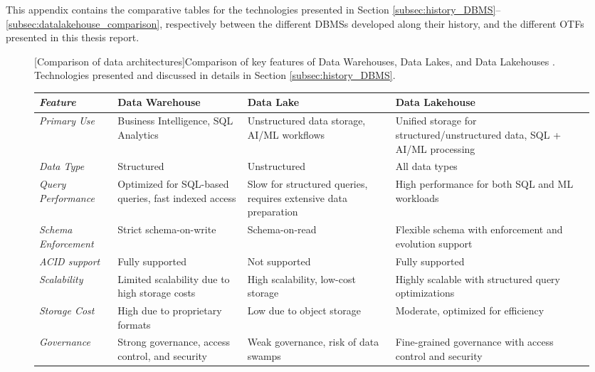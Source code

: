 This appendix contains the comparative tables for the technologies presented in Section \ref{subsec:history_DBMS}--\ref{subsec:datalakehouse_comparison}, respectively between the different \glspl{DBMS} developed along their history, and the different \Glspl{OTF} presented in this thesis report.


\begin{figure}
    \centering
    \begin{minipage}[b]{\textwidth}
        \centering
        [Comparison of data architectures]{Comparison of key features of Data Warehouses, Data Lakes, and Data Lakehouses \cite{inmonFiveStepsSuccessful}. Technologies presented and discussed in details in Section \ref{subsec:history_DBMS}.}
        \label{tbl:DBMS_comparison}
            \begin{tabular}{|p{2.2cm}|p{3cm}|p{2.9cm}|p{3cm}|}
            \hline
            \textit{\textbf{Feature}} & \textbf{Data Warehouse} & \textbf{Data Lake} & \textbf{Data Lakehouse} \\
            \hline
            \textit{Primary Use} & Business Intelligence, \gls{SQL} Analytics & Unstructured data storage, \gls{AI}/\gls{ML} workflows & Unified storage for structured/unstructured data, \gls{SQL} + \gls{AI}/\gls{ML} processing \\
            \hline
            \textit{Data Type} & Structured & Unstructured & All data types \\
            \hline
            \textit{Query Performance} & Optimized for \gls{SQL}-based queries, fast indexed access & Slow for structured queries, requires extensive data preparation & High performance for both \gls{SQL} and \gls{ML} workloads \\
            \hline
            \textit{Schema Enforcement} & Strict schema-on-write & Schema-on-read & Flexible schema with enforcement and evolution support \\
            \hline
            \textit{\gls{ACID} support} & Fully supported & Not supported & Fully supported \\
            \hline
            \textit{Scalability} & Limited scalability due to high storage costs & High scalability, low-cost storage & Highly scalable with structured query optimizations \\
            \hline
            \textit{Storage Cost} & High due to proprietary formats & Low due to object storage & Moderate, optimized for efficiency \\
            \hline
            \textit{Governance} & Strong governance, access control, and security & Weak governance, risk of data swamps & Fine-grained governance with access control and security \\

\end{tabular}
\end{minipage}
\end{figure}
